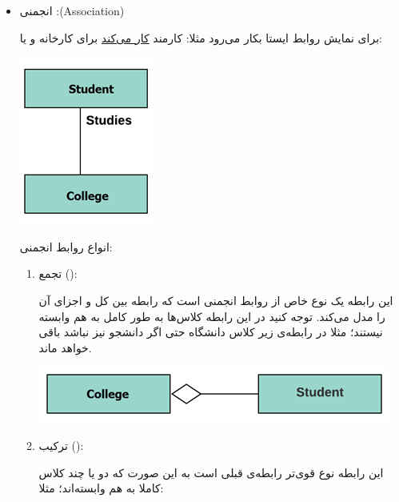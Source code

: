 \documentclass[]{article}
\begin{document}
\begin{itemize}[label=\textcolor{listColor}{$\blacklozenge$}]
\begin{itemize}[label=\textcolor{umlrelcolor}{$\blacksquare$}]
\begin{center}
\end{center}

\newpage

 \item
   {\fehrest \textcolor{umlrelcolor}{انجمنی  :(Association)
 }}


 
 برای نمایش روابط ایستا بکار می‌رود مثلا:  کارمند \underline{کار می‌کند} برای کارخانه و یا:
 
 

    \begin{center}

\includegraphics[]{images/image5.png}

\end{center}
 
 انواع روابط انجمنی: 
 
 \begin{enumerate}

\item
تجمع ():
 
 این رابطه یک نوع خاص از روابط انجمنی است که رابطه بین کل و اجزای آن را مدل می‌کند. توجه کنید در این رابطه کلاس‌ها به طور کامل به هم وابسته نیستند؛ مثلا 
در رابطه‌ی زیر کلاس دانشگاه حتی اگر دانشجو نیز نباشد باقی خواهد ماند.

\begin{center}


  \includegraphics[]{images/image9.png}
 



\end{center} 
 
 \newpage
 \item
ترکیب ():
 
این رابطه نوع قوی‌تر رابطه‌ی قبلی است به این صورت که دو یا چند کلاس کاملا به هم وابسته‌اند؛ مثلا:



\end{enumerate}
\end{itemize}
\end{itemize}
\end{document}
